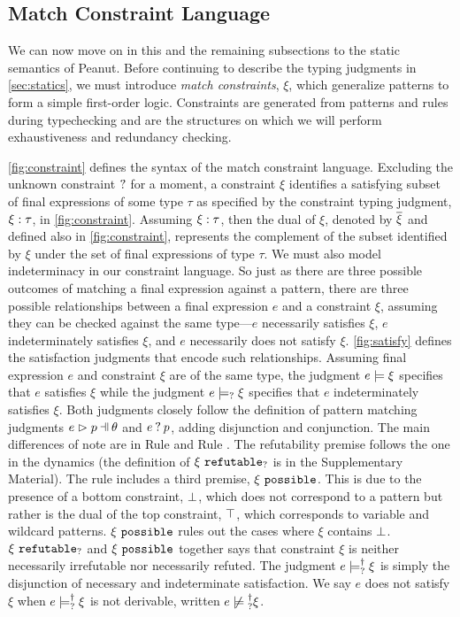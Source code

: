 \subsection{Match Constraint Language}\label{sec:constraint}
We can now move on in this and the remaining subsections to the static semantics of Peanut. Before continuing to describe the typing judgments in \autoref{sec:statics}, we must introduce \emph{match constraints}, $\xi$,
which generalize patterns to form a simple first-order logic. Constraints are generated from patterns and rules during typechecking and are the structures on which we will perform exhaustiveness and redundancy checking. 




\autoref{fig:constraint} defines the syntax of the match constraint language. 
Excluding the unknown constraint $\mathtt{?}$ for a moment, a constraint $\xi$ identifies a satisfying subset of final expressions of some type $\tau$ as specified by the constraint typing judgment,  $\xi : \tau$, in \autoref{fig:constraint}.
Assuming $\xi : \tau$, then the dual of $\xi$, denoted by $\overline{\xi}$ and defined also in \autoref{fig:constraint}, represents the complement of the subset identified by $\xi$ under the set of final expressions of type $\tau$.
We must also model indeterminacy in our constraint language. So just as there are three possible outcomes of matching a final expression against a pattern, there are three possible relationships between a final expression $e$ and a constraint $\xi$, assuming they can be checked against the same type---$e$ necessarily satisfies $\xi$, $e$ indeterminately satisfies $\xi$, and $e$ necessarily does not satisfy $\xi$. 
%
\autoref{fig:satisfy} defines the satisfaction judgments that encode such relationships. Assuming
final expression $e$ and constraint $\xi$ are of the same type, the
judgment $e \models \xi$ specifies that $e$ satisfies $\xi$ while
the judgment $e \models_{?} \xi$ specifies that $e$ indeterminately satisfies $\xi$. Both judgments closely follow the definition of pattern matching judgments $\hpatmatch{e}{p}{\theta}$ and $e \mathbin{?} p$, adding disjunction and conjunction. The main differences of note are in Rule \CSNotIntroPair and Rule \CMSNotIntro. The refutability premise follows the one in the dynamics (the definition of $\xi ~\mathtt{refutable}_?$ is in the Supplementary Material). The \CMSNotIntro rule includes a third premise, $\xi ~\mathtt{possible}$. This is due to the presence of a bottom constraint, $\bot$, which does not correspond to a pattern but rather is the dual of the top constraint, $\top$, which corresponds to variable and wildcard patterns. 
$\xi ~\mathtt{possible}$ rules out the cases where $\xi$ contains $\bot$. $\xi ~\mathtt{refutable}_?$ and $\xi ~\mathtt{possible}$ together says that constraint $\xi$ is neither necessarily irrefutable nor necessarily refuted.
The judgment $e \models_{?}^{\dag} \xi$ is simply the disjunction of necessary and indeterminate satisfaction. 
We say $e$ does not satisfy $\xi$ when $e \models_{?}^{\dag} \xi$ is not derivable, written $\cnotsatisfyormay{e}{\xi}$.

